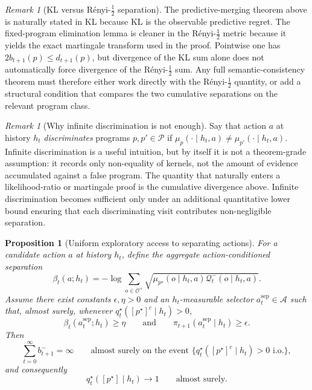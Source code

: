 \documentclass[11pt]{article}
\newtheorem{proposition}[definition]{Proposition}
\theoremstyle{remark}
\newtheorem{remark}[definition]{Remark}
\newcommand{\Acal}{\mathcal{A}}
\newcommand{\Ocal}{\mathcal{O}}
\newcommand{\Pcal}{\mathcal{P}}
\newcommand{\Qcal}{\mathcal{Q}}
\begin{document}
\begin{remark}[KL versus R\'enyi-\(\frac12\) separation]
The predictive-merging theorem above is naturally stated in KL because KL is the observable predictive regret. The fixed-program elimination lemma is cleaner in the R\'enyi-\(\frac12\) metric because it yields the exact martingale transform used in the proof. Pointwise one has \(2b_{t+1}(p) \le d_{t+1}(p)\), but divergence of the KL sum alone does not automatically force divergence of the R\'enyi-\(\frac12\) sum. Any full semantic-consistency theorem must therefore either work directly with the R\'enyi-\(\frac12\) quantity, or add a structural condition that compares the two cumulative separations on the relevant program class.
\end{remark}

\begin{remark}[Why infinite discrimination is not enough]
Say that action \(a\) at history \(h_t\) \emph{discriminates} programs \(p, p' \in \Pcal\) if \(\mu_p(\cdot\mid h_t,a) \ne \mu_{p'}(\cdot\mid h_t,a)\). Infinite discrimination is a useful intuition, but by itself it is not a theorem-grade assumption: it records only non-equality of kernels, not the amount of evidence accumulated against a false program. The quantity that naturally enters a likelihood-ratio or martingale proof is the cumulative divergence above. Infinite discrimination becomes sufficient only under an additional quantitative lower bound ensuring that each discriminating visit contributes non-negligible separation.
\end{remark}

\begin{proposition}[Uniform exploratory access to separating actions]
\label{prop:exploration-sufficient}
For a candidate action \(a\) at history \(h_t\), define the aggregate action-conditioned separation
\[
\beta_t(a;h_t)
=
-\log \sum_{o \in \Ocal^+}
\sqrt{
\mu_{p^\star}(o\mid h_t,a)
\Qcal_t^-(o\mid h_t,a)
}.
\]
Assume there exist constants \(\epsilon,\eta>0\) and an \(h_t\)-measurable selector \(a_t^{\mathrm{sep}}\in\Acal\) such that, almost surely, whenever \(q_t^\star([p^\star]^c\mid h_t)>0\),
\[
\beta_t(a_t^{\mathrm{sep}};h_t)\ge \eta
\qquad\text{and}\qquad
\pi_{t+1}(a_t^{\mathrm{sep}}\mid h_t)\ge \epsilon.
\]
Then
\[
\sum_{t=0}^{\infty} b_{t+1}^- = \infty
\qquad\text{almost surely on the event } \{q_t^\star([p^\star]^c\mid h_t)>0 \text{ i.o.}\},
\]
and consequently
\[
q_t^\star([p^\star]\mid h_t)\to 1
\qquad\text{almost surely.}
\]
\end{proposition}
\end{document}
